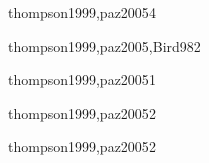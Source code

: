 \begin{syllabus}
\begin{unit}{\PLSIXDef}{thompson1999,paz2005}{4}
   \begin{unitgoals}
      \item \PLSIXObjTHREE
      \item \PLSIXObjFOUR
      \item \PLSIXObjFIVE
   \end{unitgoals}
\end{unit}

\begin{unit}{\SEFIVEDef}{thompson1999,paz2005,Bird98}{2}
   \begin{topics}
      \item \SEFIVETopicConceptos
   \end{topics}

   \begin{unitgoals}
      \item \SEFIVEObjFIVE
   \end{unitgoals}
\end{unit}

\begin{unit}{\SEONEDef}{thompson1999,paz2005}{1}

   \begin{topics}
      \item \SEONETopicConceptos
   \end{topics}

   \begin{unitgoals}
      \item \SEONEObjONE
   \end{unitgoals}
\end{unit}

\begin{unit}{\SETHREEDef}{thompson1999,paz2005}{2}
   \begin{topics}
      \item \SETHREETopicEntornos
      \item \SETHREETopicAnalisis
   \end{topics}

   \begin{unitgoals}
      \item \SETHREEObjONE
   \end{unitgoals}
\end{unit}

\begin{unit}{\SETWODef}{thompson1999,paz2005}{2}
   \begin{topics}
      \item \SETWOTopicProgramacion
      \item \SETWOTopicProgramacionpor
   \end{topics}

   \begin{unitgoals}
      \item \SETWOObjONE
   \end{unitgoals}
\end{unit}

\begin{coursebibliography}

\end{coursebibliography}
\end{syllabus}

